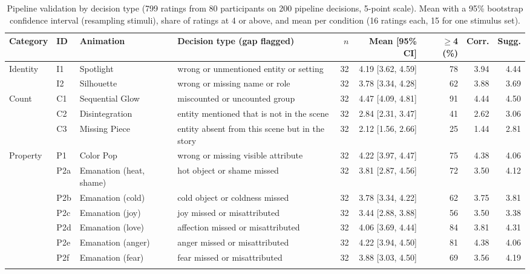 \begin{table}[t]
\caption{Pipeline validation by decision type (799 ratings from 80 participants on 200 pipeline decisions, 5-point scale). Mean with a 95\% bootstrap confidence interval (resampling stimuli), share of ratings at 4 or above, and mean per condition (16 ratings each, 15 for one stimulus set).}
\label{tab:pipeline-validation}
\small
\begin{tabular}{llllrrrrr}
\toprule
Category & ID & Animation & Decision type (gap flagged) & $n$ & Mean [95\% CI] & $\geq$4 (\%) & Corr. & Sugg. \\
\midrule
Identity & I1 & Spotlight & wrong or unmentioned entity or setting & 32 & 4.19 [3.62, 4.59] & 78 & 3.94 & 4.44 \\
 & I2 & Silhouette & wrong or missing name or role & 32 & 3.78 [3.34, 4.28] & 62 & 3.88 & 3.69 \\
\addlinespace[2pt]
Count & C1 & Sequential Glow & miscounted or uncounted group & 32 & 4.47 [4.09, 4.81] & 91 & 4.44 & 4.50 \\
 & C2 & Disintegration & entity mentioned that is not in the scene & 32 & 2.84 [2.31, 3.47] & 41 & 2.62 & 3.06 \\
 & C3 & Missing Piece & entity absent from this scene but in the story & 32 & 2.12 [1.56, 2.66] & 25 & 1.44 & 2.81 \\
\addlinespace[2pt]
Property & P1 & Color Pop & wrong or missing visible attribute & 32 & 4.22 [3.97, 4.47] & 75 & 4.38 & 4.06 \\
 & P2a & Emanation (heat, shame) & hot object or shame missed & 32 & 3.81 [2.87, 4.56] & 72 & 3.50 & 4.12 \\
 & P2b & Emanation (cold) & cold object or coldness missed & 32 & 3.78 [3.34, 4.22] & 62 & 3.75 & 3.81 \\
 & P2c & Emanation (joy) & joy missed or misattributed & 32 & 3.44 [2.88, 3.88] & 56 & 3.50 & 3.38 \\
 & P2d & Emanation (love) & affection missed or misattributed & 32 & 4.06 [3.69, 4.44] & 84 & 3.81 & 4.31 \\
 & P2e & Emanation (anger) & anger missed or misattributed & 32 & 4.22 [3.94, 4.50] & 81 & 4.38 & 4.06 \\
 & P2f & Emanation (fear) & fear missed or misattributed & 32 & 3.88 [3.03, 4.50] & 69 & 3.56 & 4.19 \\
\addlinespace[2pt]

\end{tabular}
\end{table}
